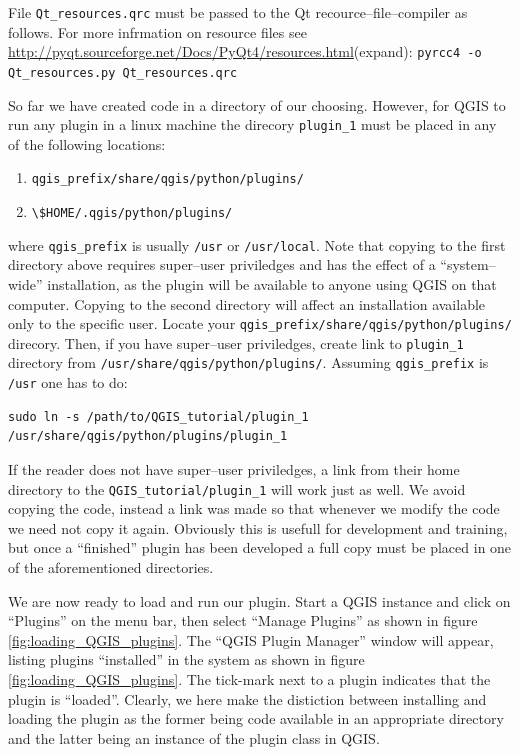 
File \lstinline{Qt_resources.qrc} must be passed to the Qt recource--file--compiler as follows. For more infrmation on resource files see \url{http://pyqt.sourceforge.net/Docs/PyQt4/resources.html}(expand):
\lstinline{pyrcc4 -o Qt_resources.py Qt_resources.qrc}
\par%
So far we have created code in a directory of our choosing. However, for QGIS to run any plugin in a linux machine the direcory \lstinline{plugin_1} must be placed in any of the following locations:
\begin{enumerate}
  \item \lstinline{qgis_prefix/share/qgis/python/plugins/}
  \item \lstinline{\$HOME/.qgis/python/plugins/}
\end{enumerate}
where  \lstinline{qgis_prefix} is usually \lstinline{/usr} or \lstinline{/usr/local}. Note that copying to the first directory above requires super--user priviledges and has the effect of a ``system--wide'' installation, as the plugin will be available to anyone using QGIS on that computer. Copying to the second directory will affect an installation available only to the specific user. Locate your \lstinline{qgis_prefix/share/qgis/python/plugins/} direcory. Then, if you have super--user priviledges, create link to \lstinline{plugin_1} directory from \lstinline{/usr/share/qgis/python/plugins/}. Assuming \lstinline{qgis_prefix} is \lstinline{/usr} one has to do:
\begin{lstlisting}
sudo ln -s /path/to/QGIS_tutorial/plugin_1 /usr/share/qgis/python/plugins/plugin_1
\end{lstlisting}
If the reader does not have super--user priviledges, a link from their home directory to the \lstinline{QGIS_tutorial/plugin_1} will work just as well. We avoid copying the code, instead a link was made so that whenever we modify the code we need not copy it again. Obviously this is usefull for development and training, but once a ``finished'' plugin has been developed a full copy must be placed in one of the aforementioned directories.
\par%
We are now ready to load and run our plugin. Start a QGIS instance and click on ``Plugins'' on the menu bar, then select ``Manage Plugins'' as shown in figure \ref{fig:loading_QGIS_plugins}. The ``QGIS Plugin Manager'' window will appear, listing plugins ``installed'' in the system as shown in figure \ref{fig:loading_QGIS_plugins}. The tick-mark next to a plugin indicates that the plugin is ``loaded''. Clearly, we here make the distiction between installing and loading the plugin as the former being code available in an appropriate directory and the latter being an instance of the plugin class in QGIS.
